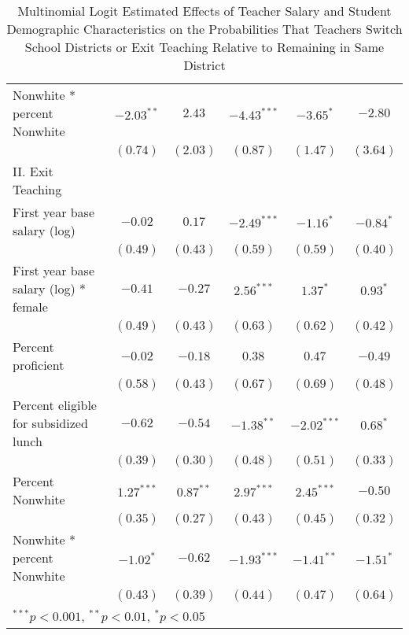\documentclass[]{article}
\begin{document}
\begin{table}
\begin{center}
\begin{tabular}{l c c c c c }
\quad Nonwhite * percent Nonwhite            & $-2.03^{**}$ & $2.43$       & $-4.43^{***}$ & $-3.65^{*}$   & $-2.80$     \\
                                                & $(0.74)$     & $(2.03)$     & $(0.87)$      & $(1.47)$      & $(3.64)$    \\
II. Exit Teaching                               &              &              &               &               &             \\
\quad First year base salary (log)           & $-0.02$      & $0.17$       & $-2.49^{***}$ & $-1.16^{*}$   & $-0.84^{*}$ \\
                                                & $(0.49)$     & $(0.43)$     & $(0.59)$      & $(0.59)$      & $(0.40)$    \\
\quad First year base salary (log) * female  & $-0.41$      & $-0.27$      & $2.56^{***}$  & $1.37^{*}$    & $0.93^{*}$  \\
                                                & $(0.49)$     & $(0.43)$     & $(0.63)$      & $(0.62)$      & $(0.42)$    \\
\quad Percent proficient                     & $-0.02$      & $-0.18$      & $0.38$        & $0.47$        & $-0.49$     \\
                                                & $(0.58)$     & $(0.43)$     & $(0.67)$      & $(0.69)$      & $(0.48)$    \\
\quad Percent eligible for subsidized lunch  & $-0.62$      & $-0.54$      & $-1.38^{**}$  & $-2.02^{***}$ & $0.68^{*}$  \\
                                                & $(0.39)$     & $(0.30)$     & $(0.48)$      & $(0.51)$      & $(0.33)$    \\
\quad Percent Nonwhite                       & $1.27^{***}$ & $0.87^{**}$  & $2.97^{***}$  & $2.45^{***}$  & $-0.50$     \\
                                                & $(0.35)$     & $(0.27)$     & $(0.43)$      & $(0.45)$      & $(0.32)$    \\
\quad Nonwhite * percent Nonwhite            & $-1.02^{*}$  & $-0.62$      & $-1.93^{***}$ & $-1.41^{**}$  & $-1.51^{*}$ \\
                                                & $(0.43)$     & $(0.39)$     & $(0.44)$      & $(0.47)$      & $(0.64)$    \\
\hline
\multicolumn{6}{l}{\scriptsize{$^{***}p<0.001$, $^{**}p<0.01$, $^*p<0.05$}}
\end{tabular}
\caption{Multinomial Logit Estimated Effects of Teacher Salary and Student Demographic Characteristics on the Probabilities That Teachers Switch School Districts or Exit Teaching Relative to Remaining in Same District}
\label{tbl:reg_mlogit}
\end{center}
\end{table}
\end{document}
